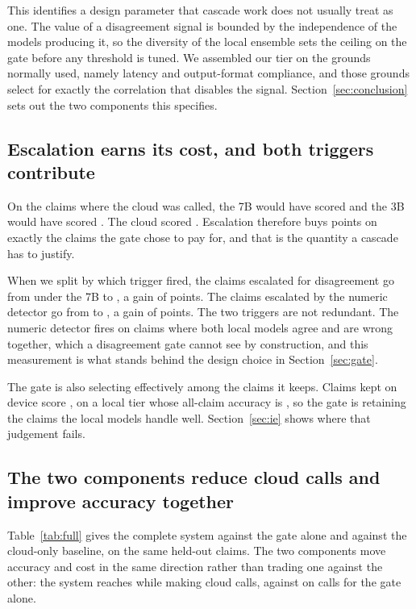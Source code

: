 \documentclass{article}
\begin{document}
This identifies a design parameter that cascade work does not usually treat as one. The
value of a disagreement signal is bounded by the independence of the models producing it, so
the diversity of the local ensemble sets the ceiling on the gate before any threshold is
tuned. We assembled our tier on the grounds normally used, namely latency and output-format
compliance, and those grounds select for exactly the correlation that disables the signal.
Section~\ref{sec:conclusion} sets out the two components this specifies.

\subsection{Escalation earns its cost, and both triggers contribute}
\label{sec:triggers}

On the \cloudCalls{} claims where the cloud was called, the 7B would have scored
\escWouldSevenB{} and the 3B would have scored \escWouldThreeB{}. The cloud scored
\escCloudGave{}. Escalation therefore buys \escGain{} points on exactly the claims the
gate chose to pay for, and that is the quantity a cascade has to justify.

When we split by which trigger fired, the \trigDisagreeN{} claims escalated for
disagreement go from \trigDisagreeSevenB{} under the 7B to \trigDisagreeCloud{}, a gain of
\trigDisagreeGain{} points. The \trigNumericN{} claims escalated by the numeric detector
go from \trigNumericSevenB{} to \trigNumericCloud{}, a gain of \trigNumericGain{} points.
The two triggers are not redundant. The numeric detector fires on claims where both local
models agree and are wrong together, which a disagreement gate cannot see by construction,
and this measurement is what stands behind the design choice in Section~\ref{sec:gate}.

The gate is also selecting effectively among the claims it keeps. Claims kept on device
score \accKeptLocal{}, on a local tier whose all-claim accuracy is \accSevenB{}, so the gate
is retaining the claims the local models handle well. Section~\ref{sec:ie} shows where that
judgement fails.

\subsection{The two components reduce cloud calls and improve accuracy together}
\label{sec:fullresults}

Table~\ref{tab:full} gives the complete system against the gate alone and against the
cloud-only baseline, on the same \nTest{} held-out claims. The two components move accuracy
and cost in the same direction rather than trading one against the other: the system reaches
\accFull{} while making \fullCloudCalls{} cloud calls, against \accRouted{} on
\cloudCalls{} calls for the gate alone.
\end{document}
